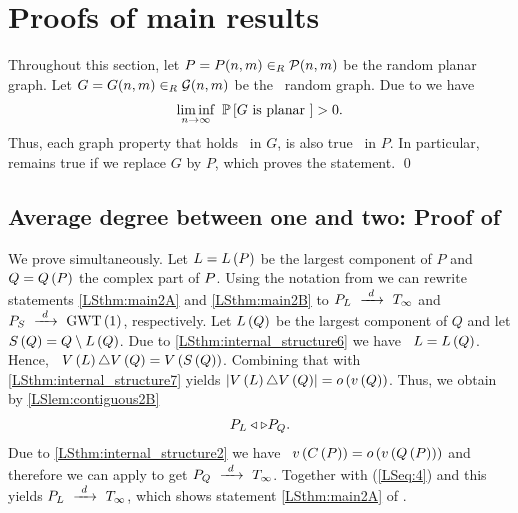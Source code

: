 \section{Proofs of main results}\label{LSsec:proofs}
Throughout this section, let $P=P(n,m)\in_R \mathcal{P}(n,m)$ be the random planar graph.
Let $G=G(n,m)\in_R\mathcal{G}(n,m)$ be the \ER\ random graph. Due to  we have
\begin{align*}
	\liminf_{n \to \infty}~ \mathbb{P}\left[G \text{ is planar }\right]>0.
\end{align*}
Thus, each graph property that holds \whp\ in $G$, is also true \whp\ in $P$. In particular,  remains true if we replace $G$ by $P$, which proves the statement. \qed

\subsection[Average degree between one and two]{Average degree between one and two: Proof of }\label{LSsub:main_proofs}
We prove  simultaneously. Let $L=L\left(P\right)$ be the largest component of $P$ and $Q=Q\left(P\right)$ the complex part of $P$. Using the notation from  we can rewrite statements \ref{LSthm:main2A} and \ref{LSthm:main2B} to $P_{L}~\xrightarrow{~d~}~T_\infty$ and $P_{S}~\xrightarrow{~d~}~\operatorname{GWT}\left(1\right)$, respectively. Let $L\left(Q\right)$ be the largest component of $Q$ and let $S\left(Q\right)=Q\setminus L\left(Q\right)$. Due to \ref{LSthm:internal_structure6} we have \whp\ $L=L\left(Q\right)$. Hence, \whp\ $V\left(L\right)\triangle V\left(Q\right)=V\left(S\left(Q\right)\right)$. Combining that with \ref{LSthm:internal_structure7} yields $\left|V\left(L\right)\triangle V\left(Q\right)\right|=o\left(v\left({Q}\right)\right)$. Thus, we obtain by \ref{LSlem:contiguous2B}
\begin{align}\label{LSeq:4}
P_L \triangleleft \triangleright P_Q.
\end{align}
Due to \ref{LSthm:internal_structure2} we have \whp\ $v\left({C\left(P\right)}\right)=o\left(v\left({Q\left(P\right)}\right)\right)$ and therefore we can apply  to get $P_Q~\xrightarrow{~d~}~T_\infty$. Together with (\ref{LSeq:4}) and  this yields $P_L~\xrightarrow{~d~}~T_\infty$, which shows statement \ref{LSthm:main2A} of .

